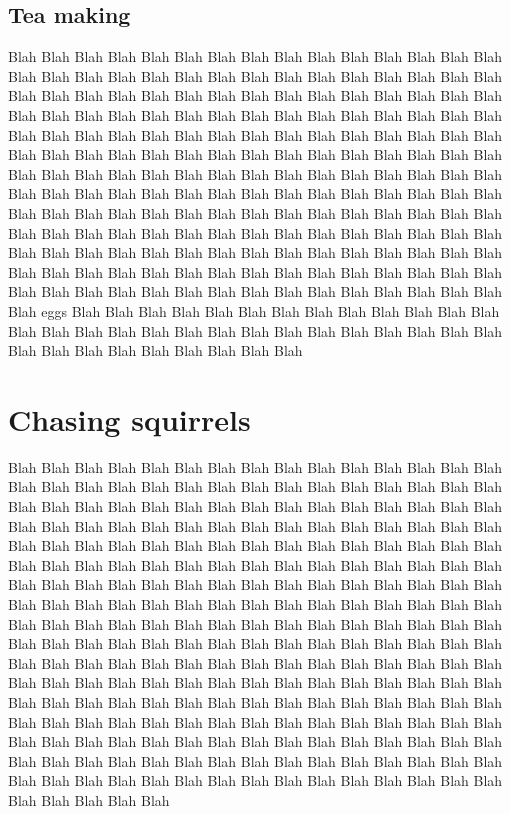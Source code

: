 \subsection{Tea making}
Blah Blah Blah Blah Blah Blah Blah Blah Blah Blah Blah Blah Blah
Blah Blah Blah Blah Blah Blah Blah Blah Blah Blah Blah Blah Blah
Blah Blah Blah Blah Blah Blah Blah Blah Blah Blah Blah Blah Blah
Blah Blah Blah Blah Blah Blah Blah Blah Blah Blah Blah Blah Blah
Blah Blah Blah Blah Blah Blah Blah Blah Blah Blah Blah Blah Blah
Blah Blah Blah Blah Blah Blah Blah Blah Blah Blah Blah Blah Blah
Blah Blah Blah Blah Blah Blah Blah Blah Blah Blah Blah Blah Blah
Blah Blah Blah Blah Blah Blah Blah Blah Blah Blah Blah Blah Blah
Blah Blah Blah Blah Blah Blah Blah Blah Blah Blah Blah Blah Blah
Blah Blah Blah Blah Blah Blah Blah Blah Blah Blah Blah Blah Blah
Blah Blah Blah Blah Blah Blah Blah Blah Blah Blah Blah Blah Blah
Blah Blah Blah Blah Blah Blah Blah Blah Blah Blah Blah Blah Blah
Blah Blah Blah Blah Blah Blah Blah Blah Blah Blah Blah Blah Blah
Blah Blah Blah Blah Blah Blah Blah Blah Blah Blah Blah Blah Blah
Blah Blah Blah Blah Blah Blah Blah Blah Blah Blah Blah Blah Blah
Blah eggs Blah Blah Blah Blah Blah Blah Blah Blah Blah Blah Blah
Blah Blah Blah Blah Blah Blah Blah Blah Blah Blah Blah Blah Blah
Blah Blah Blah Blah Blah Blah Blah Blah Blah Blah Blah Blah Blah

\section{Chasing squirrels}
Blah Blah Blah Blah Blah Blah Blah Blah Blah Blah Blah Blah Blah
Blah Blah Blah Blah Blah Blah Blah Blah Blah Blah Blah Blah Blah
Blah Blah Blah Blah Blah Blah Blah Blah Blah Blah Blah Blah Blah
Blah Blah Blah Blah Blah Blah Blah Blah Blah Blah Blah Blah Blah
Blah Blah Blah Blah Blah Blah Blah Blah Blah Blah Blah Blah Blah
Blah Blah Blah Blah Blah Blah Blah Blah Blah Blah Blah Blah Blah
Blah Blah Blah Blah Blah Blah Blah Blah Blah Blah Blah Blah Blah
Blah Blah Blah Blah Blah Blah Blah Blah Blah Blah Blah Blah Blah
Blah Blah Blah Blah Blah Blah Blah Blah Blah Blah Blah Blah Blah
Blah Blah Blah Blah Blah Blah Blah Blah Blah Blah Blah Blah Blah
Blah Blah Blah Blah Blah Blah Blah Blah Blah Blah Blah Blah Blah
Blah Blah Blah Blah Blah Blah Blah Blah Blah Blah Blah Blah Blah
Blah Blah Blah Blah Blah Blah Blah Blah Blah Blah Blah Blah Blah
Blah Blah Blah Blah Blah Blah Blah Blah Blah Blah Blah Blah Blah
Blah Blah Blah Blah Blah Blah Blah Blah Blah Blah Blah Blah Blah
Blah Blah Blah Blah Blah Blah Blah Blah Blah Blah Blah Blah Blah
Blah Blah Blah Blah Blah Blah Blah Blah Blah Blah Blah Blah Blah
Blah Blah Blah Blah Blah Blah Blah Blah Blah Blah Blah Blah Blah
Blah Blah Blah Blah Blah Blah Blah Blah Blah Blah Blah Blah Blah
Blah Blah Blah Blah Blah Blah Blah Blah Blah Blah Blah Blah Blah

